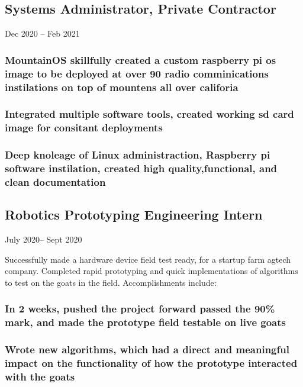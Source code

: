 \documentclass{article}
\begin{document}
    \subsection{Systems Administrator, Private Contractor} Dec 2020 – Feb 2021
        
        \vspace{-2mm}
    	\subsubsection{MountainOS skillfully created a custom raspberry pi os image to be deployed at over 90 radio comminications instilations on top of mountens all over califoria}
    	\subsubsection{Integrated multiple software tools, created working sd card image for consitant deployments}
    	\subsubsection{Deep knoleage of Linux administraction, Raspberry pi software instilation, created high quality,functional, and clean documentation}
	 
    \subsection{Robotics Prototyping Engineering Intern} July 2020– Sept 2020
            
        \vspace{0mm}
        Successfully made a hardware device field test ready, for a startup farm agtech company. Completed rapid prototyping and quick implementations of algorithms to test on the goats in the field.  Accomplishments include:
        
        \subsubsection{In 2 weeks, pushed the project forward passed the 90\% mark, and made the prototype field testable on live goats}
        
        \subsubsection{Wrote new algorithms, which had a direct and meaningful impact on the functionality of how the prototype interacted with the goats}
        
\end{document}
